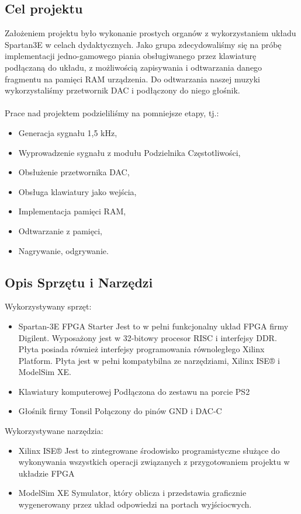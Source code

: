 \documentclass[11pt]{report}
\begin{document}
\subsection{Cel projektu}
Założeniem projektu było wykonanie prostych organów z wykorzystaniem układu Spartan3E w celach dydaktycznych.  Jako grupa zdecydowaliśmy się na próbę implementacji jedno-gamowego piania obsługiwanego przez klawiaturę podłączaną do układu, z możliwością zapisywania i odtwarzania danego fragmentu na pamięci RAM urządzenia. Do odtwarzania naszej muzyki wykorzystaliśmy przetwornik DAC i podłączony do niego głośnik.\\\\Prace nad projektem podzieliliśmy na pomniejsze etapy, tj.:
\begin{itemize}
\item Generacja sygnału 1,5 kHz,
\item Wyprowadzenie sygnału z modułu Podzielnika Częstotliwości,
\item Obsłużenie przetwornika DAC,
\item Obsługa klawiatury jako wejścia,
\item Implementacja pamięci RAM,
\item Odtwarzanie z pamięci,
\item Nagrywanie, odgrywanie.
\end{itemize}

\subsection{Opis Sprzętu i Narzędzi}

Wykorzystywany sprzęt: 

\begin{itemize}
    \item Spartan-3E FPGA Starter
	    Jest to w pełni funkcjonalny układ FPGA firmy Digilent. Wyposażony jest w 32-bitowy procesor RISC i interfejsy DDR. Płyta posiada również interfejsy programowania równoległego Xilinx Platform. Płyta jest w pełni kompatybilna ze narzędziami, Xilinx ISE® i ModelSim XE.
    
    \item Klawiatury komputerowej 
        Podłączona do zestawu na porcie PS2
        
    \item Głośnik firmy Tonsil 
        Połączony do pinów GND i DAC-C
\end{itemize}
 
Wykorzystywane narzędzia:
\begin{itemize}
    \item Xilinx ISE®
	    Jest to zintegrowane środowisko programistyczne służące do wykonywania wszystkich operacji związanych z przygotowaniem projektu w układzie FPGA 
    
    \item ModelSim XE
        Symulator, który oblicza i przedstawia graficznie wygenerowany przez układ odpowiedzi na portach wyjściocwych.

\end{itemize}
 
\end{document}

